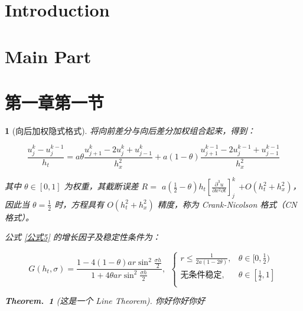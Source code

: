 \documentclass[a4paper]{article}  %
\theoremstyle{MyLineTheoremStyle} %
\newtheorem{LineTheorem}{Theorem.\,}
\theoremstyle{MyBlockTheoremStyle} %
\theoremstyle{MySubsubsectionStyle} %
\newtheorem{definition}{}
\begin{document}
\begin{multicols*}{4}
\newpage


\section{Introduction}  
\lipsum[1] %


\section{Main Part}  
\lipsum[1-4] %


\section{第一章第一节}


\begin{definition}[向后加权隐式格式]

将向前差分与向后差分加权组合起来，得到：

\begin{equation}\label{公式5}
\frac{u_{j}^{k}-u_{j}^{k-1}}{h_t}=a\theta\frac{u_{j+1}^{k}-2u_{j}^{k}+u_{j-1}^{k}}{h_x^2}+a(1-\theta)\frac{u_{j+1}^{k-1}-2u_{j}^{k-1}+u_{j-1}^{k-1}}{h_x^2}
\end{equation}

其中 $\theta \in [0, 1]$ 为权重，其截断误差 $R = $ $a\left(\frac{1}{2}-\theta\right)h_t\left[\frac{\partial^{3}u}{\partial x^{2}\partial t}\right]_{j}^{k} $ $+O(h_t^{2}+h_x^2)$，因此当 $\theta = \frac{1}{2}$ 时，方程具有 $O(h_t^{2}+h_x^2)$ 精度，称为 Crank-Nicolson 格式（CN 格式）。


公式 \ref{公式5} 的增长因子及稳定性条件为：

\begin{equation}
G(h_t,\sigma)=\frac{1-4(1-\theta)ar\sin^2\frac{\sigma h}2}{1+4\theta ar\sin^2\frac{\sigma h}2}, \ \ 
\begin{cases}
    r\leqslant\frac{1}{2a(1-2\theta)}, & \theta \in [0, \frac{1}{2}) \\ 
    \text{无条件稳定}, & \theta \in [\frac{1}{2}, 1] \\ 
\end{cases}
\end{equation}


\begin{LineTheorem}[这是一个 Line Theorem]\label{这是一个 Line Theorem}
你好你好你好
\end{LineTheorem}


\end{definition}
\end{multicols*}
\end{document}

